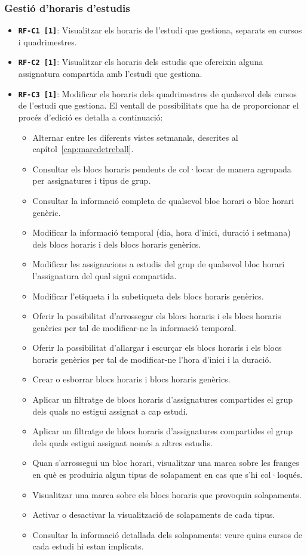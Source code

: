 \documentclass[a4paper,12pt]{ThesisStyle}
\begin{document}
\subsubsection{Gestió d'horaris d'estudis}
\begin{itemize}
  \item \texttt{\textbf{RF-C1 [1]}}: Visualitzar els horaris de l'estudi que gestiona, separats en cursos i quadrimestres.
  \item \texttt{\textbf{RF-C2 [1]}}: Visualitzar els horaris dels estudis que ofereixin alguna assignatura compartida amb l'estudi que gestiona.
  \item \texttt{\textbf{RF-C3 [1]}}: Modificar els horaris dels quadrimestres de qualsevol dels cursos de l'estudi que gestiona. El ventall de possibilitats que ha de proporcionar el procés d'edició es detalla a continuació:
  \begin{itemize}
    \item Alternar entre les diferents vistes setmanals, descrites al capítol~\ref{cap:marcdetreball}.
    \item Consultar els blocs horaris pendents de col·locar de manera agrupada per assignatures i tipus de grup.
    \item Consultar la informació completa de qualsevol bloc horari o bloc horari genèric.
    \item Modificar la informació temporal (dia, hora d'inici, duració i setmana) dels blocs horaris i dels blocs horaris genèrics.
    \item Modificar les assignacions a estudis del grup de qualsevol bloc horari l'assignatura del qual sigui compartida.
    \item Modificar l'etiqueta i la subetiqueta dels blocs horaris genèrics.
    \item Oferir la possibilitat d'arrossegar els blocs horaris i els blocs horaris genèrics per tal de modificar-ne la informació temporal.
    \item Oferir la possibilitat d'allargar i escurçar els blocs horaris i els blocs horaris genèrics per tal de modificar-ne l'hora d'inici i la duració.
    \item Crear o esborrar blocs horaris i blocs horaris genèrics.
    \item Aplicar un filtratge de blocs horaris d'assignatures compartides el grup dels quals no estigui assignat a cap estudi.
    \item Aplicar un filtratge de blocs horaris d'assignatures compartides el grup dels quals estigui assignat només a altres estudis.
    \item Quan s'arrossegui un bloc horari, visualitzar una marca sobre les franges en què es produïria algun tipus de solapament en cas que s'hi col·loqués.
    \item Visualitzar una marca sobre els blocs horaris que provoquin solapaments.
    \item Activar o desactivar la visualització de solapaments de cada tipus.
    \item Consultar la informació detallada dels solapaments: veure quins cursos de cada estudi hi estan implicats.
  \end{itemize}
\end{itemize}
\end{document}
